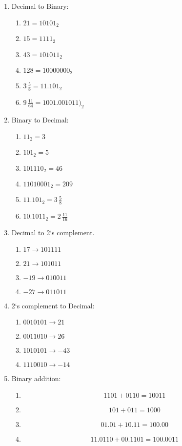 \documentclass[hidelinks,12pt]{article}
\begin{document}
\begin{enumerate}
\begin{enumerate}
    \end{enumerate}
\item Decimal to Binary:\begin{enumerate}
        \item $21=10101_2$
        \item $15=1111_2$
        \item $43=101011_2$
        \item $128=10000000_2$
        \item $3\,\frac{5}{8}=11.101_2$
        \item $9\,\frac{11}{64}=1001.001011)_2$
    \end{enumerate}
\item Binary to Decimal:\begin{enumerate}
        \item $11_2=3$
        \item $101_2=5$
        \item $101110_2=46$
        \item $11010001_2=209$
        \item $11.101_2=3\,\frac{5}{8}$
        \item $10.1011_2=2\,\frac{11}{16}$
    \end{enumerate}
\item Decimal to 2`s complement.\begin{enumerate}
        \item $17\to101111$ 
        \item $21\to101011$
        \item $-19\to010011$
        \item $-27\to011011$
    \end{enumerate}
    \item2`s complement to Decimal:\begin{enumerate}
        \item $0010101\to21$
        \item $0011010\to26$
    \item $1010101\to-43$
    \item $1110010\to-14$
    \end{enumerate}
\item Binary addition:\begin{enumerate}
            \item \[1101+0110=10011\] 
            \item \[101+011=1000\]
            \item \[01.01+10.11=100.00\]
            \item \[11.0110+00.1101=100.0011\]

\end{enumerate}
\end{enumerate}
\end{document}
